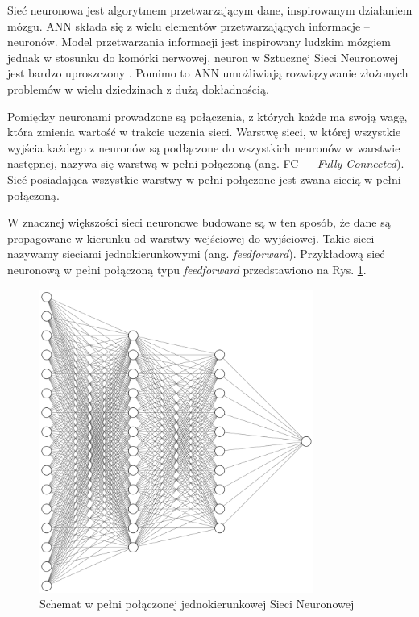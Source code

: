 Sieć neuronowa jest algorytmem przetwarzającym dane, inspirowanym działaniem mózgu. ANN składa się z wielu elementów przetwarzających informacje -- neuronów. Model przetwarzania informacji jest inspirowany ludzkim mózgiem jednak w stosunku do komórki nerwowej, neuron w Sztucznej Sieci Neuronowej jest bardzo uproszczony
\cite{tadeusiewicz1993sieci}. Pomimo to ANN umożliwiają rozwiązywanie złożonych
problemów w wielu dziedzinach z dużą dokładnością.

Pomiędzy neuronami prowadzone są połączenia, z których każde ma swoją wagę, która 
zmienia wartość w trakcie uczenia sieci. Warstwę sieci, w której wszystkie wyjścia każdego z neuronów są podłączone do wszystkich neuronów w warstwie następnej, nazywa się warstwą w pełni połączoną (ang. FC — \emph{Fully Connected}).
Sieć posiadająca wszystkie warstwy w pełni połączone jest zwana siecią w pełni połączoną. 

W znacznej większości sieci neuronowe budowane są w ten sposób, że dane są propagowane w kierunku od warstwy wejściowej do wyjściowej. Takie sieci nazywamy sieciami jednokierunkowymi (ang. \emph{feedforward}). Przykładową sieć neuronową w pełni połączoną typu \emph{feedforward} przedstawiono na Rys. \ref{ann-img}.
\bigskip

\begin{figure}[h]
  \centering
  \includegraphics[width=0.8\textwidth]{img/ann.png}
  \caption{Schemat w pełni połączonej jednokierunkowej Sieci Neuronowej}
  \label{ann-img}
\end{figure}


